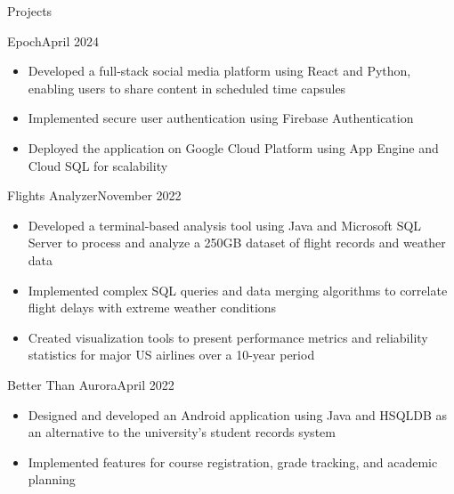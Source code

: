 \documentclass{article}
\newlength{\tabin}
\newlength{\secsep}
\newcommand{\lineunder}{\vspace*{-8pt} \\ \hspace*{-6pt} \hrulefill \\ \vspace*{-15pt}}
\newenvironment{tabbedsection}[1]{
    \begin{list}{}{
        \setlength{\itemsep}{0pt}
        \setlength{\labelsep}{0pt}
        \setlength{\labelwidth}{0pt}
        \setlength{\leftmargin}{\tabin}
        \setlength{\rightmargin}{\tabin}
        \setlength{\listparindent}{0pt}
        \setlength{\parsep}{0pt}
        \setlength{\parskip}{0pt}
        \setlength{\partopsep}{0pt}
        \setlength{\topsep}{#1}
    }
        \item[]
        }{
    \end{list}}
\newenvironment{resume_section}[1]{
    \vspace{2\secsep}
    \textsc{\large#1}
    \lineunder
    \begin{tabbedsection}{\secsep}
    }{\end{tabbedsection}}
\newenvironment{resume_subsection}[2]{
    \begin{minipage}[t]{0.75\linewidth}
        \textbf{#1}
    \end{minipage}%
    \begin{minipage}[t]{0.25\linewidth}
        \hfill \footnotesize #2
    \end{minipage}
    \begin{tabbedsection}{0.5\secsep}
    }{\end{tabbedsection}}
\newenvironment{subitems}{
    \renewcommand{\labelitemi}{-}
    \begin{itemize}
        \setlength{\labelsep}{1em}
        }{
    \end{itemize}}
\begin{document}
\begin{resume_section}{Projects}
        \begin{resume_subsection}{Epoch}{April 2024}
            \begin{subitems}
                \item Developed a full-stack social media platform using React and Python, enabling users to share content in scheduled time capsules
                \item Implemented secure user authentication using Firebase Authentication
                \item Deployed the application on Google Cloud Platform using App Engine and Cloud SQL for scalability
            \end{subitems}
        \end{resume_subsection}

        \begin{resume_subsection}{Flights Analyzer}{November 2022}
            \begin{subitems}
                \item Developed a terminal-based analysis tool using Java and Microsoft SQL Server to process and analyze a 250GB dataset of flight records and weather data
                \item Implemented complex SQL queries and data merging algorithms to correlate flight delays with extreme weather conditions
                \item Created visualization tools to present performance metrics and reliability statistics for major US airlines over a 10-year period
            \end{subitems}
        \end{resume_subsection}

        \begin{resume_subsection}{Better Than Aurora}{April 2022}
            \begin{subitems}
                \item Designed and developed an Android application using Java and HSQLDB as an alternative to the university's student records system
                \item Implemented features for course registration, grade tracking, and academic planning
            \end{subitems}
        \end{resume_subsection}
    \end{resume_section}
\end{document}
